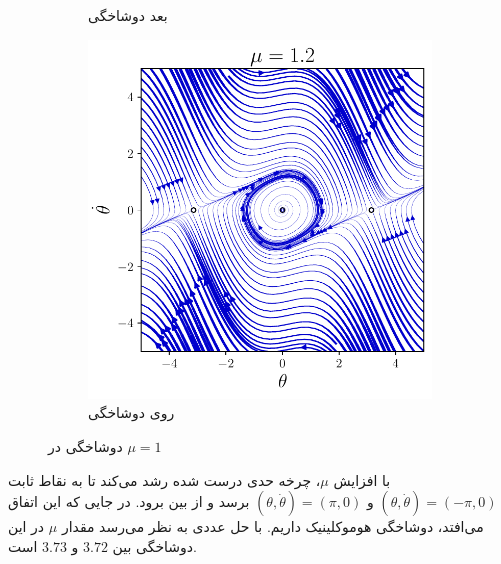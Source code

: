\documentclass[12pt,a4paper]{article}
\begin{document}
\begin{figure}[h!]
\begin{subfigure}{0.49\linewidth}
			\caption{بعد دوشاخگی}
		\end{subfigure}
		\begin{subfigure}{0.49\linewidth}
			\centering
			\includegraphics[width=\linewidth]{fig/8.4.4.mu1.2}
			\caption{روی دوشاخگی}
		\end{subfigure}
		\caption{دوشاخگی  در $\mu=1$}
	\end{figure}

	با افزایش $\mu$، چرخه حدی درست شده رشد می‌کند تا به نقاط ثابت $(\theta, \dot{\theta}) = (-\pi, 0)$
	و $(\theta, \dot{\theta}) = (\pi, 0)$ برسد و از بین برود. در جایی که این اتفاق می‌افتد، دوشاخگی هوموکلینیک داریم.
	با حل عددی به نظر می‌رسد مقدار $\mu$ در این دوشاخگی بین $3.72$ و $3.73$ است.
	
\end{document}
